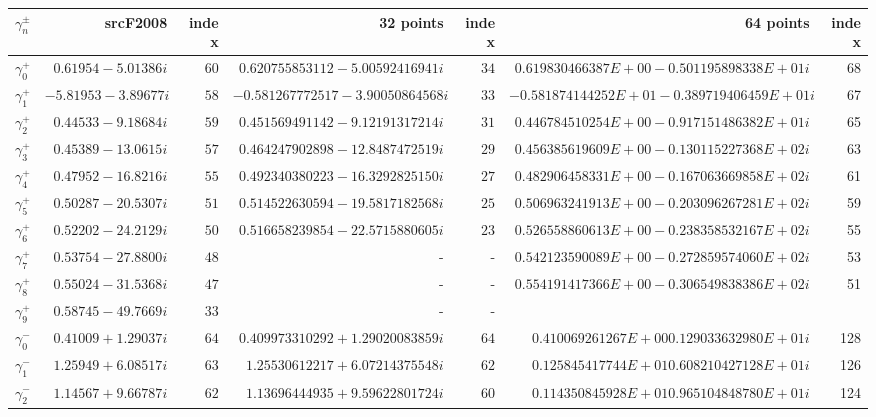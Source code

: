 \documentclass[a4paper]{article}
\begin{document}
\begin{table}
 \centering
 \begin{adjustbox}{width=1\textwidth}
     \small
 \begin{tabular}{c | r | r | r | r | r | r }
 \hline
 $\gamma^{\pm}_n$ & srcF2008 & index  & 32 points & index & 64 points& index\\
 \hline
 $\gamma_0^{+}$ &  $ 0.61954  - 5.01386 i$ &$ 60$  &$ 0.620755853112 - 5.00592416941i$ & $34 $ & $0.619830466387E+00 -0.501195898338E+01i$ &68 \\
 $\gamma_1^{+}$ &  $-5.81953  - 3.89677 i$ &$ 58$  &$-0.581267772517 - 3.90050864568i$& $33 $ & $-0.581874144252E+01 -0.389719406459E+01 i$ &67\\
 $\gamma_2^{+}$ &  $ 0.44533  - 9.18684 i$ &$ 59$  &$ 0.451569491142 - 9.12191317214i$ &$ 31$&$0.446784510254E+00 -0.917151486382E+01 i$& 65 \\
 $\gamma_3^{+}$ &  $ 0.45389  - 13.0615 i$ &$ 57$  &$ 0.464247902898 - 12.8487472519i $& $29 $&$  0.456385619609E+00 -0.130115227368E+02i$& 63   \\ 
 $\gamma_4^{+}$ &  $ 0.47952  - 16.8216 i$ &$ 55$  &$ 0.492340380223 - 16.3292825150i $& $27 $&$ 0.482906458331E+00 -0.167063669858E+02i$ &61\\
 $\gamma_5^{+}$ &  $ 0.50287  - 20.5307 i$ &$ 51$  &$ 0.514522630594 -19.5817182568i$& $25$ & $0.506963241913E+00 -0.203096267281E+02i$ &59 \\
 $\gamma_6^{+}$ &  $ 0.52202  - 24.2129 i$ &$ 50$  &$ 0.516658239854 -22.5715880605i$& $23$ & $0.526558860613E+00 -0.238358532167E+02i$ & 55 \\
 $\gamma_7^{+}$ &  $ 0.53754  - 27.8800 i$ &$ 48$  & - & -&$0.542123590089E+00 -0.272859574060E+02i$ & 53 \\                       
 $\gamma_8^{+}$ &  $ 0.55024  - 31.5368 i$ &$ 47$  & - & - & $0.554191417366E+00 -0.306549838386E+02i $ & 51 \\ 
 $\gamma_9^{+}$ &  $ 0.58745  - 49.7669 i$ &$ 33$  &- &- \\ \hline  
 $\gamma_0^{-}$ &  $ 0.41009  + 1.29037 i$ &$ 64$  &$0.409973310292  + 1.29020083859i$& $64 $ & $0.410069261267E+00  0.129033632980E+01i $ &128 \\
 $\gamma_1^{-}$ &  $ 1.25949  + 6.08517 i$ &$ 63$  &$1.25530612217  + 6.07214375548i $& $62 $&$0.125845417744E+01  0.608210427128E+01i$ & 126\\
 $\gamma_2^{-}$ &  $ 1.14567  + 9.66787 i$ &$ 62$  &$1.13696444935  + 9.59622801724i $& $ 60$ &$0.114350845928E+01  0.965104848780E+01i$& 124 \\

\end{tabular}
\end{adjustbox}
\end{table}
\end{document}
